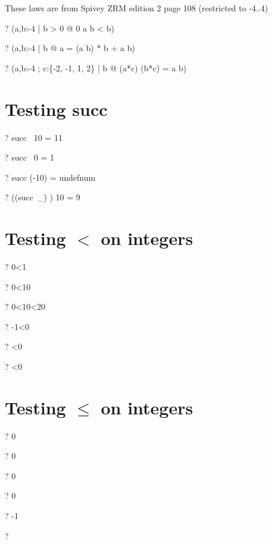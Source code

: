 \documentclass{article}
\newcommand{\negate}{-}
\begin{document}
 These laws are from Spivey ZRM edition 2 page 108 (restricted to -4..4)
\begin{zed} \vdash?   (\forall a,b:\negate 4  | b > 0 @ 0 \leq a \mod b < b) \end{zed}
\begin{zed} \vdash?   (\forall a,b:\negate 4  | b  @ a = (a \div b) * b + a \mod b) \end{zed}
\begin{zed} \vdash?   (\forall a,b:\negate 4 ; c:\{\negate 2, \negate 1, 1, 2\} | b  @ (a*c) \div (b*c) = a \div b) \end{zed}

\section{Testing succ}
\begin{zed} \vdash?   succ~ 10 = 11 \end{zed}
\begin{zed} \vdash?   succ~ 0 = 1 \end{zed}
\begin{zed} \vdash?   succ (\negate 10) = undefnum \end{zed}
\begin{zed} \vdash?   ((succ~\_) \inv) 10 = 9 \end{zed}

\section{Testing $<$ on integers}
\begin{zed} \vdash?   0<1 \end{zed}
\begin{zed} \vdash?   0<10 \end{zed}
\begin{zed} \vdash?   0<10<20 \end{zed}
\begin{zed} \vdash?   \negate 1<0 \end{zed}
\begin{zed} \vdash?   <0 \end{zed}
\begin{zed} \vdash?   <0 \end{zed}

\section{Testing $\leq$ on integers}
\begin{zed} \vdash?   0  \end{zed}
\begin{zed} \vdash?   0  \end{zed}
\begin{zed} \vdash?   0  \end{zed}
\begin{zed} \vdash?   0   \end{zed}
\begin{zed} \vdash?   \negate 1  \end{zed}
\begin{zed} \vdash?     \end{zed}
\end{document}
